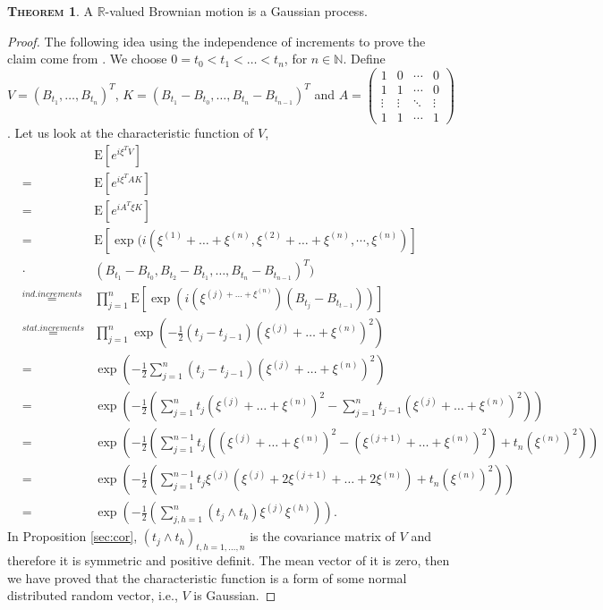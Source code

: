 \documentclass[a4paper, twoside, 11pt]{article}
\theoremstyle{definition}
\newtheorem{theorem}[definition]{\scshape Theorem}
\begin{document}
\begin{theorem}
  A $\mathbb{R}$-valued Brownian motion is a Gaussian process.
\end{theorem}
\begin{proof}
  The following idea using the independence of increments to prove the claim come from \cite{shilling}.
  We choose $0=t_0<t_1<\dots<t_n$, for $n \in \mathbb{N}$. Define
  $V = (B_{t_1},\dots,B_{t_n})^T$,  $K = (B_{t_1}-B_{t_0},\dots, B_{t_n}-B_{t_{n-1}})^T$ and 
  $A = 
  \begin{pmatrix}
	1      & 0      & \cdots & 0\\
	1      & 1      & \cdots & 0\\
	\vdots & \vdots & \ddots & \vdots \\
	1      & 1      & \cdots & 1
  \end{pmatrix}
	$.
  Let us look at the characteristic function of $V$,
  \begin{eqnarray*}
	&&\mathrm{E} [e^{i\xi^T V}]\\
	&=& \mathrm{E} [e^{i\xi^T AK}]\\ 
	&=& \mathrm{E} [e^{iA^T\xi K}]\\
	&=& \mathrm{E} [\exp(i (\xi^{(1)}+\dots+\xi^{(n)}, \xi^{(2)}+\dots+\xi^{(n)}, \cdots,\xi^{(n)})] \\
	&\cdot& (B_{t_1}-B_{t_0}, B_{t_2}-B_{t_1},\dots,B_{t_n}-B_{t_{n-1}})^T)\\
	&\overset{ind.increments}{=}& \prod_{j=1}^n \mathrm{E} [\exp(i(\xi^{(j)+\dots+\xi^{(n)}})(B_{t_j}-B_{t_{t-1}}))]\\
	&\overset{stat.increments}{=}& \prod_{j=1}^n \exp(-\frac{1}{2}(t_j - t_{j-1})(\xi^{(j)}+\dots+\xi^{(n)})^2) \\
	&=& \exp\left(-\frac{1}{2}\sum_{j=1}^n (t_j - t_{j-1})(\xi^{(j)}+\dots+\xi^{(n)})^2\right)\\
    &=& \exp\left(-\frac{1}{2}\left(\sum_{j=1}^n t_j(\xi^{(j)}+\dots+\xi^{(n)})^2 - \sum_{j=1}^n t_{j-1}(\xi^{(j)}+\dots+\xi^{(n)})^2\right)\right)\\
	&=& \exp\left(-\frac{1}{2}\left(\sum_{j=1}^{n-1} t_j((\xi^{(j)}+\dots+\xi^{(n)})^2 - (\xi^{(j+1)}+\dots+\xi^{(n)})^2) + t_n(\xi^{(n)})^2\right)\right)\\
	&=& \exp\left(-\frac{1}{2}\left(\sum_{j=1}^{n-1} t_j\xi^{(j)}(\xi^{(j)}+2\xi^{(j+1)}+\dots+2\xi^{(n)}) + t_n(\xi^{(n)})^2\right)\right)\\
	&=& \exp\left(-\frac{1}{2}\left(\sum_{j,h=1}^n(t_j\wedge t_h)\xi^{(j)}\xi^{(h)}\right)\right).
  \end{eqnarray*}
  In Proposition \ref{sec:cor}, $(t_j\wedge t_h)_{t,h=1,\dots,n}$ is the covariance matrix of $V$ and therefore it is symmetric and positive definit. The mean vector of it is zero, then we have proved that the characteristic function is a form of some normal distributed random vector, i.e., $V$ is Gaussian.
\end{proof}
\end{document}
